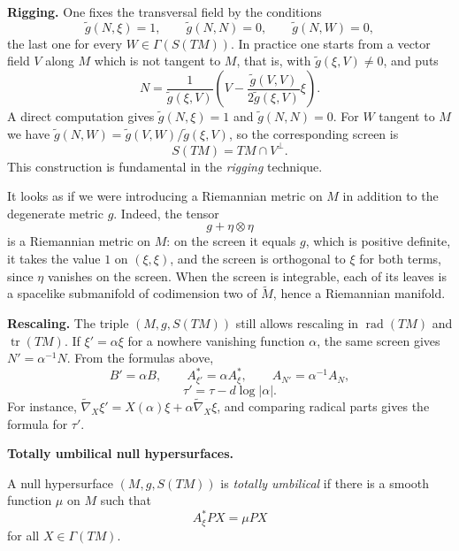 \medskip\noindent
{\bf Rigging.}
One fixes the transversal field by the
conditions
$$
\widetilde{g}(N,\xi)=1,\qquad
\widetilde{g}(N,N)=0,\qquad
\widetilde{g}(N,W)=0,
$$
the last one for every $W\in
\Gamma(S(TM))$. In practice one starts
from a vector field $V$ along $M$ which is
not tangent to $M$, that is, with
$\widetilde{g}(\xi,V)\neq 0$, and puts
\begin{equation}
\label{equation-solis-rigging}
N=\frac{1}{\widetilde{g}(\xi,V)}
\left(V-\frac{\widetilde{g}(V,V)}
{2\widetilde{g}(\xi,V)}\xi\right).
\end{equation}
A direct computation gives
$\widetilde{g}(N,\xi)=1$ and
$\widetilde{g}(N,N)=0$. For $W$ tangent
to $M$ we have
$\widetilde{g}(N,W)
=\widetilde{g}(V,W)/\widetilde{g}(\xi,V)$,
so the corresponding screen is
$$
S(TM)=TM\cap V^{\perp}.
$$
This construction is fundamental in the
\emph{rigging} technique.

\begin{remark}
\label{remark-solis-rigged-metric}
It looks as if we were introducing a
Riemannian metric on $M$ in addition to
the degenerate metric $g$. Indeed, the
tensor
$$
g+\eta\otimes\eta
$$
is a Riemannian metric on $M$: on the
screen it equals $g$, which is positive
definite, it takes the value $1$ on
$(\xi,\xi)$, and the screen is orthogonal
to $\xi$ for both terms, since $\eta$
vanishes on the screen. When the screen
is integrable, each of its leaves is a
spacelike submanifold of codimension two
of $\widetilde{M}$, hence a Riemannian
manifold.
\end{remark}

\noindent
{\bf Rescaling.} The triple
$(M,g,S(TM))$ still allows rescaling in
$\operatorname{rad}(TM)$ and
$\operatorname{tr}(TM)$. If
$\xi'=\alpha\xi$ for a nowhere vanishing
function $\alpha$, the same screen gives
$N'=\alpha^{-1}N$. From the formulas
above,
$$
B'=\alpha B,\qquad
A^*_{\xi'}=\alpha A^*_{\xi},\qquad
A_{N'}=\alpha^{-1}A_N,
$$
$$
\tau'=\tau-d\log|\alpha|.
$$
For instance,
$\widetilde{\nabla}_X\xi'
=X(\alpha)\xi+\alpha\widetilde{\nabla}_X
\xi$, and comparing radical parts gives
the formula for $\tau'$.

\medskip\noindent
{\bf Totally umbilical null
hypersurfaces.}

\begin{definition}
\label{definition-solis-totally-umbilical}
A null hypersurface $(M,g,S(TM))$ is
\emph{totally umbilical} if there is a
smooth function $\mu$ on $M$ such that
$$
A^*_{\xi}PX=\mu PX
$$
for all $X\in\Gamma(TM)$.
\end{definition}

